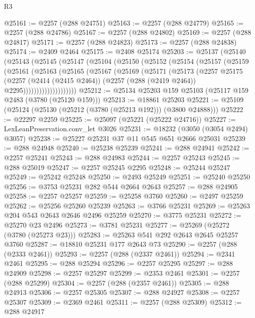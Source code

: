 \begin{lexlean}{R3}
\begin{coremodule}
@25161 := @2257 (@288 @24751)
@25163 := @2257 (@288 @24779)
@25165 := @2257 (@288 @24786)
@25167 := @2257 (@288 @24802)
@25169 := @2257 (@288 @24817)
@25171 := @2257 (@288 @24823)
@25173 := @2257 (@288 @24838)
@25174 := @2409 @2464
@25175 := @2408 @25174
@25203 := @25137
    (@25140
      (@25143
        (@25145
          (@25147
            (@25104
              (@25150
                (@25152
                  (@25154
                    (@25157
                      (@25159
                        (@25161
                          (@25163
                            (@25165
                              (@25167
                                (@25169
                                  (@25171
                                    (@25173
                                      (@2257
                                        @25175
                                        (@2257
                                          (@2414 (@2415 @2464))
                                          (@2257 (@288 (@2419 @2464)) @2295))))))))))))))))))))
@25212 := @25134 @25203 @159 @25103 (@25117 @159 @2483 (@3780 (@25120 @159)))
@25213 := @18861 @25203
@25221 := @25109 (@25124 (@25130 (@25212 (@3780 (@25213 @192))) (@3800 @24888)))
@25222 := @22297 @2259
@25225 := @25097 (@25221 (@25222 @24716))
@25227 := LexLeanPreservation.conv_let @3026
@25231 := @18232 (@3050 (@3054 @2494) @3057)
@25238 := @25227 @25231 @37 @11 @545 @651 @2666 @25031
@25239 := @288 @24948
@25240 := @25238 @25239
@25241 := @288 @24941
@25242 := @2257 @25241
@25243 := @288 @24983
@25244 := @2257 @25243
@25245 := @288 @25019
@25247 := @2257 @25245 @2295
@25248 := @25244 @25247
@25249 := @25242 @25248
@25250 := @2493 @25249
@25251 := @25240 @25250
@25256 := @3753 @25231 @282 @544 @2664 @2643
@25257 := @288 @24905
@25258 := @2257 @25257
@25259 := @25258 @3760
@25260 := @2497 @25259
@25262 := @25256 @25260 @25239
@25263 := @3766 @25231
@25269 := @25263 @204 @543 @2643 @2646 @2496 @25259
@25270 := @3775 @25231
@25272 := @25270 @23 @2496
@25273 := @3781 @25231
@25277 := @25269 (@25272 (@3780 (@25273 @23)))
@25283 := @25263 @541 @292 @2643 @2645 @25257 @3760
@25287 := @18810 @25231 @177 @2643 @73
@25290 := @2257 (@288 (@2333 @2461))
@25293 := @2257 (@288 (@2337 @2461))
@25294 := @2341 @2461
@25295 := @288 @25294
@25296 := @2257 @25295
@25297 := @288 @24909
@25298 := @2257 @25297
@25299 := @2353 @2461
@25301 := @2257 (@288 @25299)
@25304 := @2257 (@288 (@2357 @2461))
@25305 := @288 @24913
@25306 := @2257 @25305
@25307 := @288 @24927
@25308 := @2257 @25307
@25309 := @2369 @2461
@25311 := @2257 (@288 @25309)
@25312 := @288 @24917

\end{coremodule}
\end{lexlean}
